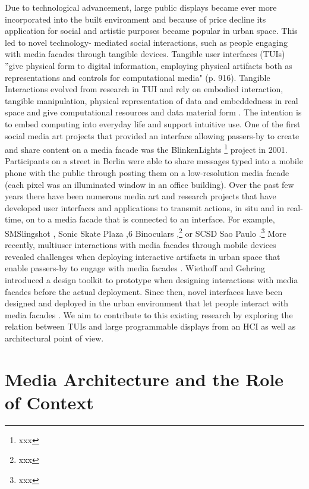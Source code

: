 Due to technological advancement, large public displays became ever more incorporated
into the built environment and because of price decline its application for
social and artistic purposes became popular in urban space. This led to novel technology-
mediated social interactions, such as people engaging with media facades
through tangible devices.
Tangible user interfaces (TUIs) ''give physical form to digital information,
employing physical artifacts both as representations and controls for computational
media" \cite{Ullmer2000}(p. 916). Tangible Interactions evolved from
research in TUI and rely on embodied interaction, tangible manipulation, physical
representation of data and embeddedness in real space and give computational
resources and data material form \cite{Hornecker2006}. The intention is to
embed computing into everyday life and support intuitive use.
One of the first social media art projects that provided an interface allowing
passers-by to create and share content on a media facade was the BlinkenLights \footnote{xxx}
project in 2001. Participants on a street in Berlin were able to share messages
typed into a mobile phone with the public through posting them on a low-resolution
media facade (each pixel was an illuminated window in an office building).
Over the past few years there have been numerous media art and research projects that have developed user interfaces and applications to transmit actions, in situ and in real-time, on to a media facade that is connected to an interface. For example, SMSlingshot \cite{Fischer2012}, Sonic Skate Plaza \cite{Serret2013},6 Binoculars \cite{Guljajeva2013},\footnote{xxx} or SCSD Sao Paulo \cite{Behrens2013}.\footnote{xxx}
More recently, multiuser interactions with media facades through mobile
devices revealed challenges when deploying interactive artifacts in urban space
that enable passers-by to engage with media facades \cite{Boring2011}. Wiethoff
and Gehring \cite{Wiethoff2012} introduced a design toolkit to prototype when designing interactions with media facades before the actual deployment. Since then, novel interfaces
have been designed and deployed in the urban environment that let people
interact with media facades \cite{Hoggenmueller2014}. We aim to contribute
to this existing research by exploring the relation between TUIs and large
programmable displays from an HCI as well as architectural point of view.

\section {Media Architecture and the Role of Context}

